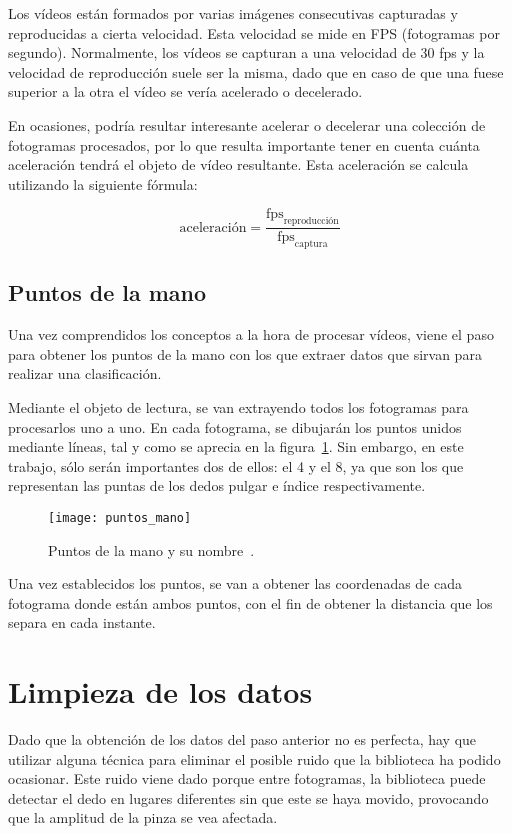 Los vídeos están formados por varias imágenes consecutivas capturadas y reproducidas a cierta velocidad. Esta velocidad se mide en FPS (fotogramas por segundo). Normalmente, los vídeos se capturan a una velocidad de 30 fps y la velocidad de reproducción suele ser la misma, dado que en caso de que una fuese superior a la otra el vídeo se vería acelerado o decelerado. 

En ocasiones, podría resultar interesante acelerar o decelerar una colección de fotogramas procesados, por lo que resulta importante tener en cuenta cuánta aceleración tendrá el objeto de vídeo resultante. Esta aceleración se calcula utilizando la siguiente fórmula:

\begin{equation}
	\text{aceleración} = \frac{\text{fps}_{\text{reproducción}}}{\text{fps}_{\text{captura}}}
\end{equation} 

\subsection{Puntos de la mano}
Una vez comprendidos los conceptos a la hora de procesar vídeos, viene el paso para obtener los puntos de la mano con los que extraer datos que sirvan para realizar una clasificación.

Mediante el objeto de lectura, se van extrayendo todos los fotogramas para procesarlos uno a uno. En cada fotograma, se dibujarán los puntos unidos mediante líneas, tal y como se aprecia en la figura~\ref{fig:puntosmano}. Sin embargo, en este trabajo, sólo serán importantes dos de ellos: el 4 y el 8, ya que son los que representan las puntas de los dedos pulgar e índice respectivamente.

\begin{figure}[h]
	\texttt{[image: puntos\_mano]}
	\caption{Puntos de la mano y su nombre~\cite{mediapipehands}.}
	\label{fig:puntosmano}
\end{figure}

Una vez establecidos los puntos, se van a obtener las coordenadas de cada fotograma donde están ambos puntos, con el fin de obtener la distancia que los separa en cada instante.

\section{Limpieza de los datos}
Dado que la obtención de los datos del paso anterior no es perfecta, hay que utilizar alguna técnica para eliminar el posible ruido que la biblioteca ha podido ocasionar. Este ruido viene dado porque entre fotogramas, la biblioteca puede detectar el dedo en lugares diferentes sin que este se haya movido, provocando que la amplitud de la pinza se vea afectada.

